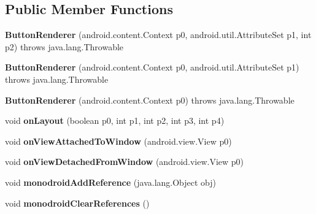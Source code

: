 \subsection*{Public Member Functions}
\begin{DoxyCompactItemize}
\item 
\mbox{\label{classmd5270abb39e60627f0f200893b490a1ade_1_1ButtonRenderer_a69de53fe1b8c1bd7f640db6eef322fdd}} 
{\bfseries Button\+Renderer} (android.\+content.\+Context p0, android.\+util.\+Attribute\+Set p1, int p2)  throws java.\+lang.\+Throwable 	
\item 
\mbox{\label{classmd5270abb39e60627f0f200893b490a1ade_1_1ButtonRenderer_a032b2a49be9b19da3e846d539da04e80}} 
{\bfseries Button\+Renderer} (android.\+content.\+Context p0, android.\+util.\+Attribute\+Set p1)  throws java.\+lang.\+Throwable 	
\item 
\mbox{\label{classmd5270abb39e60627f0f200893b490a1ade_1_1ButtonRenderer_aca79f33076eb791b82fb74d4075b5805}} 
{\bfseries Button\+Renderer} (android.\+content.\+Context p0)  throws java.\+lang.\+Throwable 	
\item 
\mbox{\label{classmd5270abb39e60627f0f200893b490a1ade_1_1ButtonRenderer_af2e3875cd2b7a03f7278f91e55939532}} 
void {\bfseries on\+Layout} (boolean p0, int p1, int p2, int p3, int p4)
\item 
\mbox{\label{classmd5270abb39e60627f0f200893b490a1ade_1_1ButtonRenderer_a096ced78b676353ccc21296f8eb579a3}} 
void {\bfseries on\+View\+Attached\+To\+Window} (android.\+view.\+View p0)
\item 
\mbox{\label{classmd5270abb39e60627f0f200893b490a1ade_1_1ButtonRenderer_a197f3e7692578540f0931faffb7d50d0}} 
void {\bfseries on\+View\+Detached\+From\+Window} (android.\+view.\+View p0)
\item 
\mbox{\label{classmd5270abb39e60627f0f200893b490a1ade_1_1ButtonRenderer_a777673af96186211dacdc043e03e29c4}} 
void {\bfseries monodroid\+Add\+Reference} (java.\+lang.\+Object obj)
\item 
\mbox{\label{classmd5270abb39e60627f0f200893b490a1ade_1_1ButtonRenderer_a85b560fcbb7fbef8f3ec48b9bf724210}} 
void {\bfseries monodroid\+Clear\+References} ()
\end{DoxyCompactItemize}
